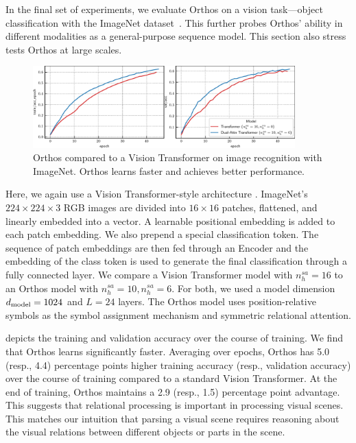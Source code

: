 In the final set of experiments, we evaluate Orthos on a vision task---object classification with the ImageNet dataset~\citep{imagenet}. This further probes Orthos' ability in different modalities as a general-purpose sequence model. This section also stress tests Orthos at large scales.

\begin{figure}[ht]
    \centering
    \includegraphics[width=0.9\textwidth]{figs/experiments/imagenet/imagenet_acc_curves.pdf}
    \caption{Orthos compared to a Vision Transformer on image recognition with ImageNet. Orthos learns faster and achieves better performance.}\label{fig:vision_acc_curve}
\end{figure}

Here, we again use a Vision Transformer-style architecture \citep{dosovitskiyImageWorth16x162020}. ImageNet's $224 \times 224 \times 3$ RGB images are divided into $16 \times 16$ patches, flattened, and linearly embedded into a vector. A learnable positional embedding is added to each patch embedding. We also prepend a special classification token. The sequence of patch embeddings are then fed through an Encoder and the embedding of the class token is used to generate the final classification through a fully connected layer. We compare a Vision Transformer model with $n_h^{sa} = 16$ to an Orthos model with $n_h^{sa} = 10, n_h^{sa} = 6$. For both, we used a model dimension $d_{\mathrm{model}} = 1024$ and $L = 24$ layers. The Orthos model uses position-relative symbols as the symbol assignment mechanism and symmetric relational attention.

 depicts the training and validation accuracy over the course of training. We find that Orthos learns significantly faster. Averaging over epochs, Orthos has 5.0 (resp., 4.4) percentage points higher training accuracy (resp., validation accuracy) over the course of training compared to a standard Vision Transformer. At the end of training, Orthos maintains a 2.9 (resp., 1.5) percentage point advantage. This suggests that relational processing is important in processing visual scenes. This matches our intuition that parsing a visual scene requires reasoning about the visual relations between different objects or parts in the scene.

